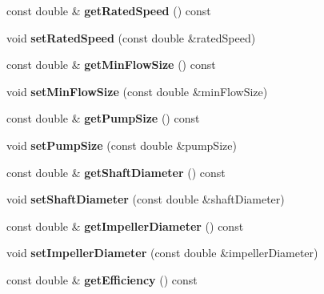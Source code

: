\begin{DoxyCompactItemize}
const double \& {\bfseries get\+Rated\+Speed} () const
\item 
\mbox{\label{class_pump_data_a449445539a72297703ac35412eb30341}} 
void {\bfseries set\+Rated\+Speed} (const double \&rated\+Speed)
\item 
\mbox{\label{class_pump_data_a57e6b89acdc2c28e49b04675cac9e5e4}} 
const double \& {\bfseries get\+Min\+Flow\+Size} () const
\item 
\mbox{\label{class_pump_data_aaa93301e7df64b058fe9733922d6821e}} 
void {\bfseries set\+Min\+Flow\+Size} (const double \&min\+Flow\+Size)
\item 
\mbox{\label{class_pump_data_a4e86b151b6505c30881b0c6a9959b2b0}} 
const double \& {\bfseries get\+Pump\+Size} () const
\item 
\mbox{\label{class_pump_data_a1a105017884ea02995e1280b10b23c7e}} 
void {\bfseries set\+Pump\+Size} (const double \&pump\+Size)
\item 
\mbox{\label{class_pump_data_a3c81e1916fd7f0e2c02506901eb285d3}} 
const double \& {\bfseries get\+Shaft\+Diameter} () const
\item 
\mbox{\label{class_pump_data_a3c8ffaa8892c288cb5c0633a95e6a177}} 
void {\bfseries set\+Shaft\+Diameter} (const double \&shaft\+Diameter)
\item 
\mbox{\label{class_pump_data_a739f74fd553a6e3da89d6cda0a112bb8}} 
const double \& {\bfseries get\+Impeller\+Diameter} () const
\item 
\mbox{\label{class_pump_data_acf108c3f243f2657e890cb59fc8094e8}} 
void {\bfseries set\+Impeller\+Diameter} (const double \&impeller\+Diameter)
\item 
\mbox{\label{class_pump_data_a59641533691eaaeec698521748804c53}} 
const double \& {\bfseries get\+Efficiency} () const
\item 
\mbox{\label{class_pump_data_a283c8ef3bc5fb41bf1dac25cced2b9ca}} 

\end{DoxyCompactItemize}
